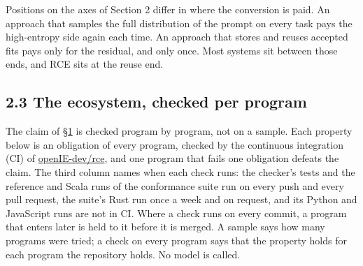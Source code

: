 \documentclass[10pt,letterpaper]{article}
\begin{document}
Positions on the axes of Section 2 differ in where the conversion is
paid. An approach that samples the full distribution of the prompt on
every task pays the high-entropy side again each time. An approach that
stores and reuses accepted fits pays only for the residual, and only
once. Most systems sit between those ends, and RCE sits at the reuse
end.

\subsection{2.3 The ecosystem, checked per
program}\label{the-ecosystem-checked-per-program}

The claim of
\href{https://research.openie.dev/papers/rce/\#1-thesis}{§1} is checked
program by program, not on a sample. Each property below is an
obligation of every program, checked by the continuous integration (CI)
of \href{https://github.com/openIE-dev/rce}{openIE-dev/rce}, and one
program that fails one obligation defeats the claim. The third column
names when each check runs: the checker's tests and the reference and
Scala runs of the conformance suite run on every push and every pull
request, the suite's Rust run once a week and on request, and its Python
and JavaScript runs are not in CI. Where a check runs on every commit, a
program that enters later is held to it before it is merged. A sample
says how many programs were tried; a check on every program says that
the property holds for each program the repository holds. No model is
called.
\end{document}
